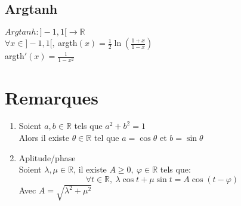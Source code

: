 \documentclass[fleqn]{article}
\theoremstyle{definition} \newtheorem*{defi}{D\'efinition}
\theoremstyle{definition} \newtheorem*{theo}{Th\'eor\`eme}
\theoremstyle{definition} \newtheorem*{prop}{Propri\'et\'e}
\theoremstyle{remark} \newtheorem*{rqs}{Remarques}
\begin{document}
\subsection{Argtanh}
\(Argtanh: ]-1,1[ \rightarrow \mathbb{R} \) \\
$\forall x \in ]-1,1[,\ $argth$(x) = \frac{1}{2} \ln(\frac{1+x}{1-x})$ \\
argth$'(x) = \frac{1}{1-x^2}$
\section{Remarques}
\begin{enumerate}
	\item Soient $a,b \in \mathbb{R}$ tels que $a^2 + b^2 = 1$\\
		Alors il existe $\theta \in \mathbb{R}$ tel que $a = \cos \theta$ et $b = \sin \theta$
	\item Aplitude/phase \\
		Soient $\lambda, \mu \in \mathbb{R}$, il existe $A \geq 0,\ \varphi \in \mathbb{R}$ tels que:
		\[\forall t \in \mathbb{R},\ \lambda \cos t + \mu \sin t = A\cos(t - \varphi)\]
		Avec $A = \sqrt{\lambda^2 + \mu^2}$
\end{enumerate}
\end{document}
